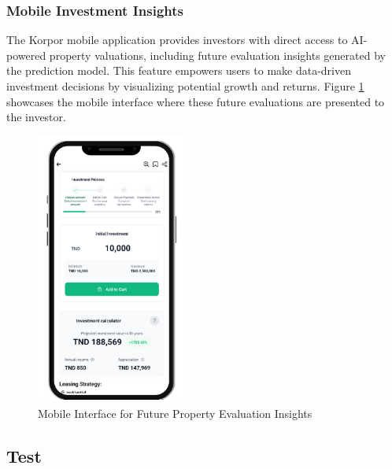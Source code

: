 \subsubsection{Mobile Investment Insights}
The Korpor mobile application provides investors with direct access to AI-powered property valuations, including future evaluation insights generated by the prediction model. This feature empowers users to make data-driven investment decisions by visualizing potential growth and returns. Figure \ref{fig:mobile-future-evaluation} showcases the mobile interface where these future evaluations are presented to the investor.
\begin{figure}[htbp]
    \centering
    \includegraphics[width=0.45\textwidth]{images/mobile_future_evaluation.png} %
    \caption{Mobile Interface for Future Property Evaluation Insights}
    \label{fig:mobile-future-evaluation}
\end{figure}


\subsection{Test}
